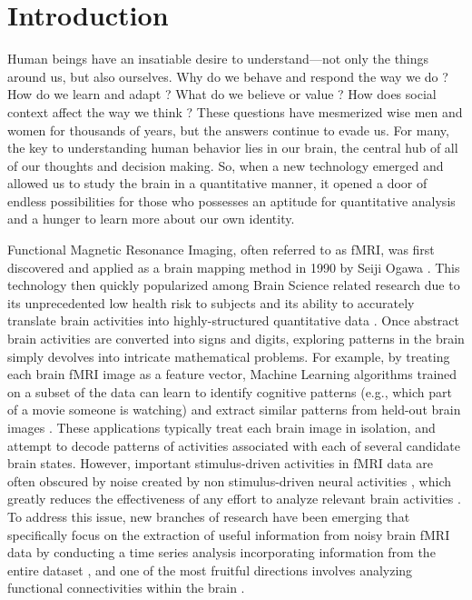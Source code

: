 \documentclass[11pt]{article}
\begin{document}
\section{Introduction}
Human beings have an insatiable desire to understand---not only the things around us, but also ourselves. Why do we behave and respond the way we do \citep{hasson2012}? How do we learn and adapt \citep{hasson2004,hasson2005}? What do we believe or value \citep{Greene01}? How does social context affect the way we think \citep{Matthew2015}? These questions have mesmerized wise men and women for thousands of years, but the answers continue to evade us. For many, the key to understanding human behavior lies in our brain, the central hub of all of our thoughts and decision making. So, when a new technology emerged and allowed us to study the brain in a quantitative manner, it opened a door of endless possibilities for those who possesses an aptitude for quantitative analysis and a hunger to learn more about our own identity.

Functional Magnetic Resonance Imaging, often referred to as fMRI, was first discovered and applied as a brain mapping method in 1990 by Seiji Ogawa \citep{Ogawa90}. This technology then quickly popularized among Brain Science related research due to its unprecedented low health risk to subjects and its ability to accurately translate brain activities into highly-structured quantitative data \citep{Logothetis01,Friston99,Friston98}. Once abstract brain activities are converted into signs and digits, exploring patterns in the brain simply devolves into intricate mathematical problems. For example, by treating each brain fMRI image as a feature vector, Machine Learning algorithms trained on a subset of the data can learn to identify cognitive patterns (e.g., which part of a movie someone is watching) and extract similar patterns from held-out brain images \citep{Norman06,peterson12,peterson17}. These applications typically treat each brain image in isolation, and attempt to decode patterns of activities associated with each of several candidate brain states. However, important stimulus-driven activities in fMRI data are often obscured by noise created by non stimulus-driven neural activities \citep{peterson11}, which greatly reduces the effectiveness of any effort to analyze relevant brain activities \citep{hasson2009}. To address this issue, new branches of research have been emerging that specifically focus on the extraction of useful information from noisy brain fMRI data by conducting a time series analysis incorporating information from the entire dataset \citep{tang2017}, and one of the most fruitful directions involves analyzing functional connectivities within the brain \citep{peterson19} \citep{peterson20}.
\end{document}
